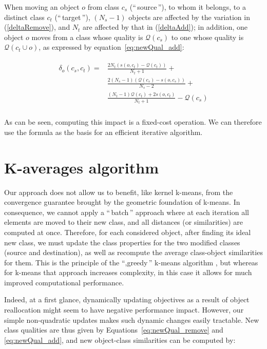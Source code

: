 \documentclass[10pt,journal,compsoc]{IEEEtran}
\newcommand{\gl}[1]{``\,#1\,''} %
\begin{document}
When moving an object $o$ from class $c_s$ (\gl{source}), to whom it belongs, to a
distinct class $c_t$ (\gl{target}), $(N_s-1)$ objects are affected
by the variation in (\ref{deltaRemove}), and $N_t$ are affected
by that in (\ref{deltaAdd}); in addition, one object $o$ moves from a class whose quality is $\mathcal{Q}(c_s)$ to one whose quality is $\mathcal{Q}\left(c_t \cup o\right)$, as expressed by equation~\ref{eq:newQual_add}:

\begin{align}
\begin{split}
  \delta_o(c_s, c_t) = & \frac{2N_t \left(s\left(o, c_t\right)-\mathcal{Q}(c_t)\right)}{N_t+1} + \\
&  \frac{2(N_s-1)\left( \mathcal{Q}(c_s) - s\left(o, c_s\right)\right)}{N_s-2}  + \\
 &  \frac{(N_t-1) \mathcal{Q}(c_t)  + 2s\left(o, c_t\right)}{N_t+1} - \mathcal{Q}(c_s) \\
\end{split}
  \label{eq:impact_classnorm}
\end{align}

As can be seen, computing this impact is a fixed-cost operation. We can therefore use the formula as the basis for an efficient iterative algorithm.

\section{K-averages algorithm}
\label{sec:algo}

Our approach does not allow us to benefit, like kernel k-means, from the convergence guarantee brought by the geometric foundation of k-means. In consequence, we cannot apply a \gl{batch} approach where at each iteration all elements are moved to their new class, and all distances (or similarities) are computed at once. Therefore, for each considered object, after finding its ideal new class, we must update the class properties for the two modified classes (source and destination), as well as recompute the average class-object similarities for them. This is the principle of the ``,greedy\,'' k-means algorithm \cite[Chapter10.8]{Duda01}, but whereas for k-means that approach increases complexity, in this case it allows for much improved computational performance.

Indeed, at a first glance, dynamically updating objectives as a result of object reallocation might seem to have negative performance impact. However, our simple non-quadratic updates makes such dynamic changes easily tractable. New class qualities are thus given by Equations~\ref{eq:newQual_remove} and \ref{eq:newQual_add}, and new object-class similarities can be computed by:
\end{document}
